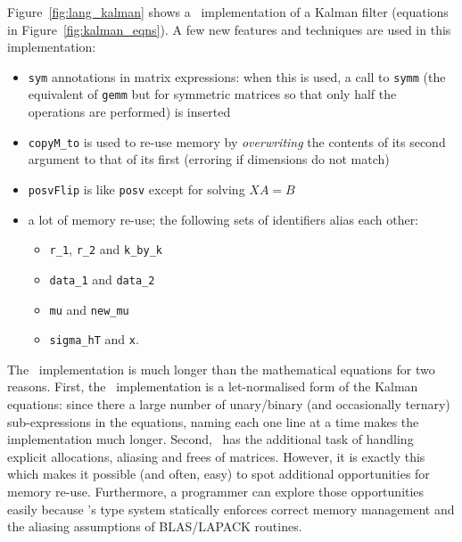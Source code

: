 Figure~\ref{fig:lang_kalman} shows a \lang\ implementation of a Kalman filter
(equations in Figure~\ref{fig:kalman_eqns}). A few new features and techniques
are used in this implementation:
\begin{itemize}

    \item \texttt{sym} annotations in matrix expressions: when this is used, a
        call to \texttt{symm} (the equivalent of \texttt{gemm} but for
        symmetric matrices so that only half the operations are performed) is
        inserted

    \item \texttt{copyM\_to} is used to re-use memory by \emph{overwriting} the
        contents of its second argument to that of its first (erroring if
        dimensions do not match)

    \item \texttt{posvFlip} is like \texttt{posv} except for solving $XA = B$

    \item a lot of memory re-use; the following sets of identifiers alias each other:
        \begin{itemize}
            \item \texttt{r\_1}, \texttt{r\_2} and \texttt{k\_by\_k}
            \item \texttt{data\_1} and \texttt{data\_2}
            \item \texttt{mu} and \texttt{new\_mu}
            \item \texttt{sigma\_hT} and \texttt{x}.
        \end{itemize}

\end{itemize}

The \lang\ implementation is much longer than the mathematical equations for
two reasons. First, the \lang\ implementation is a let-normalised form of the
Kalman equations: since there a large number of unary/binary (and occasionally
ternary) sub-expressions in the equations, naming each one line at a time makes
the implementation much longer.  Second, \lang\ has the additional task of
handling explicit allocations, aliasing and frees of matrices. However, it is
exactly this which makes it possible (and often, easy) to spot additional
opportunities for memory re-use. Furthermore, a programmer can explore those
opportunities easily because \lang's type system statically enforces correct
memory management and the aliasing assumptions of BLAS/LAPACK routines.

